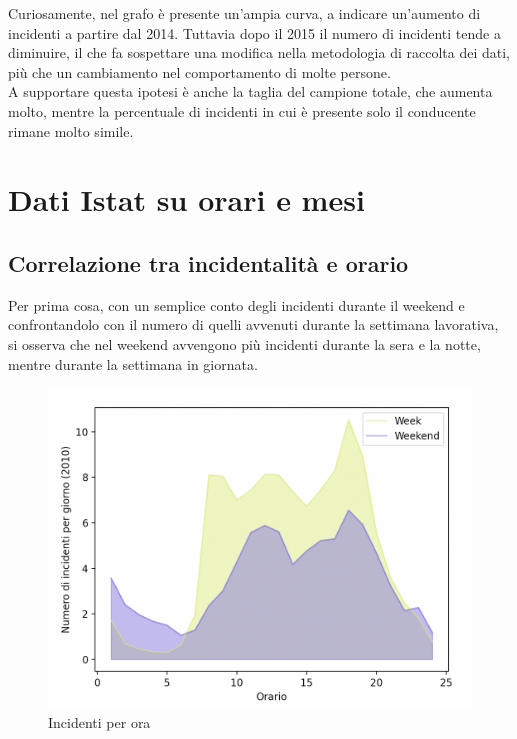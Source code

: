 \documentclass[a4paper]{report}
\begin{document}
Curiosamente, nel grafo è presente un'ampia curva, a indicare un'aumento di incidenti 
a partire dal 2014. Tuttavia dopo il 2015 il numero di incidenti tende a diminuire, il che 
fa sospettare una modifica nella metodologia di raccolta dei dati, più che un cambiamento 
nel comportamento di molte persone.\\
A supportare questa ipotesi è anche la taglia del campione totale, che aumenta molto, mentre la 
percentuale di incidenti in cui è presente solo il conducente rimane molto simile.


\section{Dati Istat su orari e mesi}

\subsection{Correlazione tra incidentalità e orario}

Per prima cosa, con un semplice conto degli incidenti durante il weekend 
e confrontandolo con il numero di quelli avvenuti durante la 
settimana lavorativa, si osserva che nel weekend avvengono più incidenti 
durante la sera e la notte, mentre durante la settimana in giornata.

\begin{figure}
    \includegraphics[width=\linewidth]{../src/incidenti/incidenti_senza_coords/ore_punta/week_weekend.png}
    \caption{Incidenti per ora}
    \label{fig:week-weekend}
\end{figure}
\end{document}
